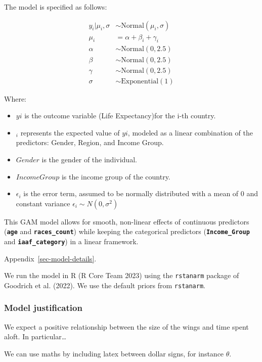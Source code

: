 \documentclass[
  letterpaper,
  DIV=11,
  numbers=noendperiod]{scrartcl}
\begin{document}
The model is specified as follows:

\begin{align} 
y_i|\mu_i, \sigma &\sim \mbox{Normal}(\mu_i, \sigma) \\
\mu_i &= \alpha + \beta_i + \gamma_i\\
\alpha &\sim \mbox{Normal}(0, 2.5) \\
\beta &\sim \mbox{Normal}(0, 2.5) \\
\gamma &\sim \mbox{Normal}(0, 2.5) \\
\sigma &\sim \mbox{Exponential}(1)
\end{align}

Where:

\begin{itemize}
\item
  \(yi\) is the outcome variable (Life Expectancy)for the i-th country.
\item
  \(_i\) represents the expected value of \(yi\), modeled as a linear
  combination of the predictors: Gender, Region, and Income Group.
\item
  \(Gender\) is the gender of the individual.
\item
  \(Income Group\) is the income group of the country.
\item
  \(\epsilon_i\) is the error term, assumed to be normally distributed
  with a mean of 0 and constant variance \(ϵ_i​∼N(0,\sigma^2)\)
\end{itemize}

This GAM model allows for smooth, non-linear effects of continuous
predictors (\textbf{\texttt{age}} and \textbf{\texttt{races\_count}})
while keeping the categorical predictors
(\textbf{\texttt{Income\_Group}} and \textbf{\texttt{iaaf\_category}})
in a linear framework.

Appendix~\ref{sec-model-details}.

We run the model in R (R Core Team 2023) using the \texttt{rstanarm}
package of Goodrich et al. (2022). We use the default priors from
\texttt{rstanarm}.

\subsubsection{Model justification}\label{model-justification}

We expect a positive relationship between the size of the wings and time
spent aloft. In particular\ldots{}

We can use maths by including latex between dollar signs, for instance
\(\theta\).
\end{document}
